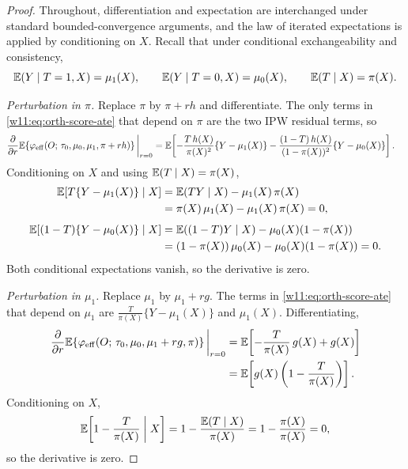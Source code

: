 \documentclass[master.tex]{subfiles}
\begin{document}
\begin{proof}
Throughout, differentiation and expectation are interchanged under
standard bounded-convergence arguments, and the law of iterated
expectations is applied by conditioning on $X$.  Recall that under
conditional exchangeability and consistency,
\[
  \mathbb{E}(Y \mid T=1, X) = \mu_1(X), \qquad
  \mathbb{E}(Y \mid T=0, X) = \mu_0(X), \qquad
  \mathbb{E}(T \mid X) = \pi(X).
\]

\medskip
\noindent\textit{Perturbation in $\pi$.}\enspace
Replace $\pi$ by $\pi + rh$ and differentiate.  The only terms in
\eqref{w11:eq:orth-score-ate} that depend on $\pi$ are the two
IPW residual terms, so
\begin{align*}
  \frac{\partial}{\partial r}
  \mathbb{E}\!\left\{\varphi_{\mathrm{eff}}(O;\,\tau_0,\mu_0,\mu_1,\pi+rh)\right\}
  \bigg|_{r=0}
  &=
  \mathbb{E}\!\left[
    -\frac{T\,h(X)}{\pi(X)^2}\{Y-\mu_1(X)\}
    -\frac{(1-T)\,h(X)}{(1-\pi(X))^2}\{Y-\mu_0(X)\}
  \right].
\end{align*}
Conditioning on $X$ and using $\mathbb{E}(T \mid X) = \pi(X)$,
\begin{align*}
  \mathbb{E}\!\left[T\{Y-\mu_1(X)\}\mid X\right]
  &= \mathbb{E}(TY \mid X) - \mu_1(X)\,\pi(X) \\
  &= \pi(X)\,\mu_1(X) - \mu_1(X)\,\pi(X) = 0, \\[4pt]
  \mathbb{E}\!\left[(1-T)\{Y-\mu_0(X)\}\mid X\right]
  &= \mathbb{E}((1-T)Y \mid X) - \mu_0(X)(1-\pi(X)) \\
  &= (1-\pi(X))\,\mu_0(X) - \mu_0(X)(1-\pi(X)) = 0.
\end{align*}
Both conditional expectations vanish, so the derivative is zero.

\medskip
\noindent\textit{Perturbation in $\mu_1$.}\enspace
Replace $\mu_1$ by $\mu_1 + rg$.  The terms in
\eqref{w11:eq:orth-score-ate} that depend on $\mu_1$ are
$\frac{T}{\pi(X)}\{Y-\mu_1(X)\}$ and $\mu_1(X)$.  Differentiating,
\begin{align*}
  \frac{\partial}{\partial r}
  \mathbb{E}\!\left\{\varphi_{\mathrm{eff}}(O;\,\tau_0,\mu_0,\mu_1+rg,\pi)\right\}
  \bigg|_{r=0}
  &=
  \mathbb{E}\!\left[-\frac{T}{\pi(X)}\,g(X) + g(X)\right] \\
  &=
  \mathbb{E}\!\left[g(X)\left(1 - \frac{T}{\pi(X)}\right)\right].
\end{align*}
Conditioning on $X$,
\[
  \mathbb{E}\!\left[1 - \frac{T}{\pi(X)}\;\middle|\; X\right]
  = 1 - \frac{\mathbb{E}(T\mid X)}{\pi(X)}
  = 1 - \frac{\pi(X)}{\pi(X)} = 0,
\]
so the derivative is zero.


\end{proof}
\end{document}
